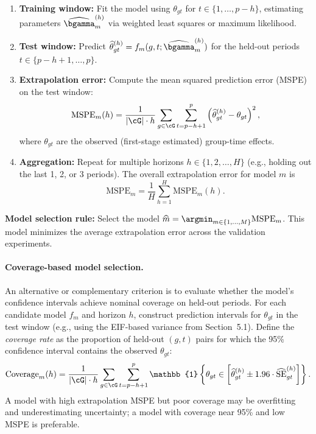 \begin{enumerate}
    \item \textbf{Training window:} Fit the model using $\theta_{gt}$ for $t \in \{1, \ldots, p - h\}$, estimating parameters $\widehat{\bgamma}_m^{(h)}$ via weighted least squares or maximum likelihood.
    \item \textbf{Test window:} Predict $\widehat{\theta}_{gt}^{(h)} = f_m(g, t; \widehat{\bgamma}_m^{(h)})$ for the held-out periods $t \in \{p - h + 1, \ldots, p\}$.
    \item \textbf{Extrapolation error:} Compute the mean squared prediction error (MSPE) on the test window:
    \[
    \text{MSPE}_m(h) = \frac{1}{|\cG| \cdot h} \sum_{g \in \cG} \sum_{t = p-h+1}^{p} \left( \widehat{\theta}_{gt}^{(h)} - \theta_{gt} \right)^2,
    \]
    where $\theta_{gt}$ are the observed (first-stage estimated) group-time effects.
    \item \textbf{Aggregation:} Repeat for multiple horizons $h \in \{1, 2, \ldots, H\}$ (e.g., holding out the last 1, 2, or 3 periods). The overall extrapolation error for model $m$ is
    \[
    \text{MSPE}_m = \frac{1}{H} \sum_{h=1}^H \text{MSPE}_m(h).
    \]
\end{enumerate}

\textbf{Model selection rule:} Select the model $\widehat{m} = \argmin_{m \in \{1,\ldots,M\}} \text{MSPE}_m$. This model minimizes the average extrapolation error across the validation experiments.

\paragraph{Coverage-based model selection.}
An alternative or complementary criterion is to evaluate whether the model's confidence intervals achieve nominal coverage on held-out periods. For each candidate model $f_m$ and horizon $h$, construct prediction intervals for $\theta_{gt}$ in the test window (e.g., using the EIF-based variance from Section~5.1). Define the \emph{coverage rate} as the proportion of held-out $(g,t)$ pairs for which the 95\% confidence interval contains the observed $\theta_{gt}$:
\[
\text{Coverage}_m(h) = \frac{1}{|\cG| \cdot h} \sum_{g \in \cG} \sum_{t = p-h+1}^{p} \mathbb{1}\left\{ \theta_{gt} \in \left[\widehat{\theta}_{gt}^{(h)} \pm 1.96 \cdot \widehat{\text{SE}}_{gt}^{(h)} \right] \right\}.
\]
A model with high extrapolation MSPE but poor coverage may be overfitting and underestimating uncertainty; a model with coverage near 95\% and low MSPE is preferable.

